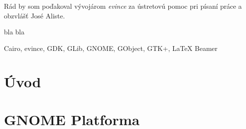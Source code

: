 \documentclass[12pt,oneside,final]{fithesis2}
\begin{document}
\FrontMatter
\ThesisTitlePage

\begin{ThesisDeclaration}
\DeclarationText
\AdvisorName
\end{ThesisDeclaration}

\begin{ThesisThanks}
Rád by som poďakoval vývojárom \emph{evince} za ústretovú pomoc pri písaní práce a obzvlášť José Aliste.
\end{ThesisThanks}  

\begin{ThesisAbstract}
bla bla
\end{ThesisAbstract}

\begin{ThesisKeyWords}
Cairo, evince, GDK, GLib, GNOME, GObject, GTK+, LaTeX Beamer
\end{ThesisKeyWords}
 
\MainMatter
\setcounter{tocdepth}{3}
\tableofcontents 
 
\chapter{Úvod}

 
\chapter{GNOME Platforma}
\end{document}
